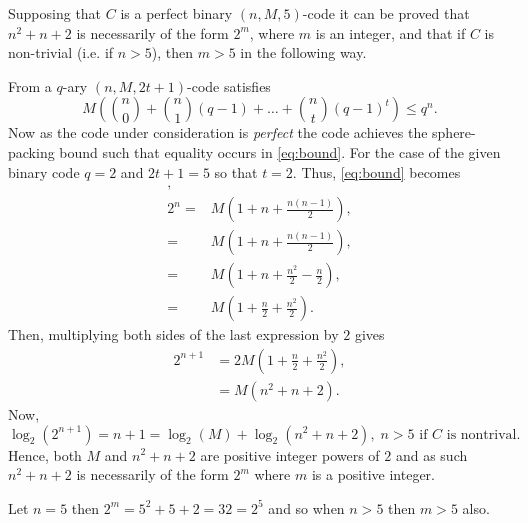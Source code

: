 Supposing that $C$ is a perfect binary $(n,M,5)$-code it can be proved that $n^2+n+2$ is necessarily of the form $2^m$, where $m$ is an integer, and that if $C$ is non-trivial (i.e. if $n>5$), then $m>5$ in the following way.

From  a $q$-ary $(n, M, 2t+1)$-code satisfies
\begin{equation}
	\label{eq:bound}
	M\left(\binom{n}{0} + \binom{n}{1}(q-1) + \ldots + \binom{n}{t}(q-1)^t\right) \leq q^n.
\end{equation}
Now as the code under consideration is \textit{perfect} the code achieves the sphere-packing bound such that equality occurs in \ref{eq:bound}. For the case of the given binary code $q=2$ and $2t+1=5$ so that $t=2$. Thus, \eqref{eq:bound} becomes
\begin{align*},\\
	2^n =&M\left(1 + n + \frac{n(n-1)}{2}\right),\\
	=&M\left(1 + n + \frac{n(n-1)}{2}\right),\\
	=&M\left(1 + n + \frac{n^2}{2}- \frac{n}{2}\right),\\
	=&M\left(1 + \frac{n}{2} + \frac{n^2}{2} \right).
\end{align*}
Then, multiplying both sides of the last expression by $2$ gives
\begin{align}
\label{eq:M}
	2^{n+1} &= 2M\left(1 + \frac{n}{2} + \frac{n^2}{2} \right),\nonumber\\
	&= M\left(n^2 +n +2\right).
\end{align}
Now,
\[
	\log_2(2^{n+1})=n+1 = \log_2(M) + \log_2(n^2+n+2),\;n>5 \text{ if $C$ is nontrival}.
\]
Hence, both $M$ and $n^2+n+2$ are positive integer powers of $2$ and as such $n^2+n+2$ is necessarily of the form $2^m$ where $m$ is a positive integer.

Let $n=5$ then $2^m=5^2+5+2 = 32=2^5$ and so when $n>5$ then $m>5$ also.